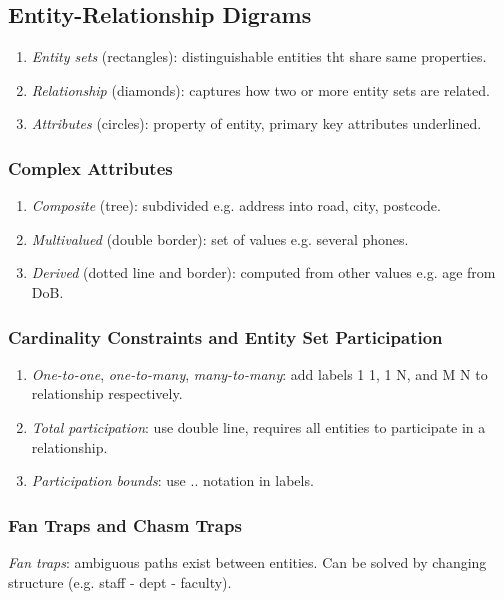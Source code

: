 \documentclass[twocolumn,english]{article}
\begin{document}
\subsection{Entity-Relationship Digrams}
\begin{enumerate}
\item \emph{Entity sets} (rectangles): distinguishable entities tht share
same properties. 
\item \emph{Relationship} (diamonds): captures how two or more entity sets
are related. 
\item \emph{Attributes} (circles): property of entity, primary key attributes
underlined. 
\end{enumerate}

\subsubsection{Complex Attributes}
\begin{enumerate}
\item \emph{Composite} (tree): subdivided e.g. address into road, city,
postcode. 
\item \emph{Multivalued} (double border): set of values e.g. several phones. 
\item \emph{Derived} (dotted line and border): computed from other values
e.g. age from DoB. 
\end{enumerate}

\subsubsection{Cardinality Constraints and Entity Set Participation}
\begin{enumerate}
\item \emph{One-to-one}, \emph{one-to-many}, \emph{many-to-many}: add labels
1 1, 1 N, and M N to relationship respectively. 
\item \emph{Total participation}: use double line, requires all entities
to participate in a relationship. 
\item \emph{Participation bounds}: use .. notation in labels. 
\end{enumerate}

\subsubsection{Fan Traps and Chasm Traps}

\emph{Fan traps}: ambiguous paths exist between entities. Can be solved
by changing structure (e.g. staff - dept - faculty).
\end{document}
